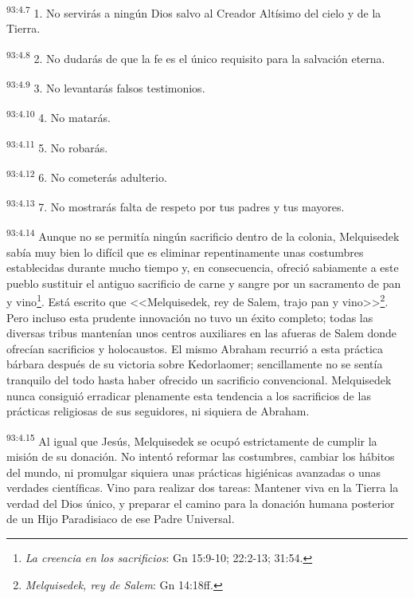\par
\textsuperscript{93:4.7} 1. No servirás a ningún Dios salvo al Creador Altísimo del cielo y de la Tierra.

\par
\textsuperscript{93:4.8} 2. No dudarás de que la fe es el único requisito para la salvación eterna.

\par
\textsuperscript{93:4.9} 3. No levantarás falsos testimonios.

\par
\textsuperscript{93:4.10} 4. No matarás.

\par
\textsuperscript{93:4.11} 5. No robarás.

\par
\textsuperscript{93:4.12} 6. No cometerás adulterio.

\par
\textsuperscript{93:4.13} 7. No mostrarás falta de respeto por tus padres y tus mayores.

\par
\textsuperscript{93:4.14} Aunque no se permitía ningún sacrificio dentro de la colonia, Melquisedek sabía muy bien lo difícil que es eliminar repentinamente unas costumbres establecidas durante mucho tiempo y, en consecuencia, ofreció sabiamente a este pueblo sustituir el antiguo sacrificio de carne y sangre por un sacramento de pan y vino\footnote{\textit{La creencia en los sacrificios}: Gn 15:9-10; 22:2-13; 31:54.}. Está escrito que <<Melquisedek, rey de Salem, trajo pan y vino>>\footnote{\textit{Melquisedek, rey de Salem}: Gn 14:18ff.}. Pero incluso esta prudente innovación no tuvo un éxito completo; todas las diversas tribus mantenían unos centros auxiliares en las afueras de Salem donde ofrecían sacrificios y holocaustos. El mismo Abraham recurrió a esta práctica bárbara después de su victoria sobre Kedorlaomer; sencillamente no se sentía tranquilo del todo hasta haber ofrecido un sacrificio convencional. Melquisedek nunca consiguió erradicar plenamente esta tendencia a los sacrificios de las prácticas religiosas de sus seguidores, ni siquiera de Abraham.

\par
\textsuperscript{93:4.15} Al igual que Jesús, Melquisedek se ocupó estrictamente de cumplir la misión de su donación. No intentó reformar las costumbres, cambiar los hábitos del mundo, ni promulgar siquiera unas prácticas higiénicas avanzadas o unas verdades científicas. Vino para realizar dos tareas: Mantener viva en la Tierra la verdad del Dios único, y preparar el camino para la donación humana posterior de un Hijo Paradisiaco de ese Padre Universal.

